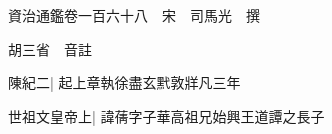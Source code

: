 






























































資治通鑑卷一百六十八　宋　司馬光　撰

胡三省　音註

陳紀二|{
	起上章執徐盡玄黓敦牂凡三年}


世祖文皇帝上|{
	諱蒨字子華高祖兄始興王道譚之長子}


